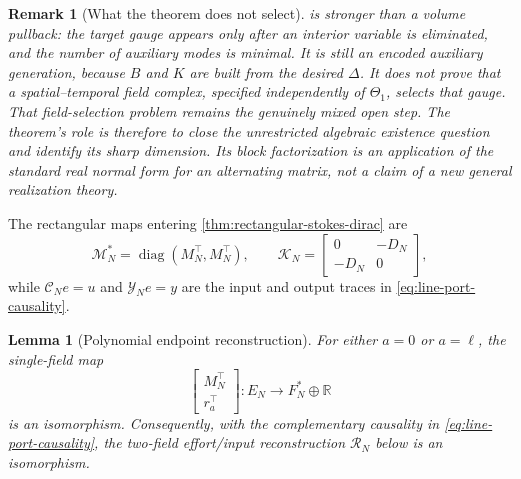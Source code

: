 \documentclass[11pt,a4paper]{article}
\newtheorem{lemma}[theorem]{Lemma}
\newtheorem{remark}[theorem]{Remark}
\newcommand{\diag}{\operatorname{diag}}
\begin{document}
\begin{remark}[What the theorem does not select]
\label{rem:auxiliary-generation-not-selection}
 is stronger than a volume
pullback: the target gauge appears only after an interior variable is
eliminated, and the number of auxiliary modes is minimal.  It is still an
\emph{encoded auxiliary generation}, because \(B\) and \(K\) are built
from the desired \(\Delta\).  It does not prove that a spatial--temporal
field complex, specified independently of \(\Theta_1\), selects that gauge.
That field-selection problem remains the genuinely mixed open step.
The theorem's role is therefore to close the unrestricted algebraic
existence question and identify its sharp dimension.  Its block
factorization is an application of the standard real normal form for an
alternating matrix, not a claim of a new general realization theory.
\end{remark}

The rectangular maps entering \cref{thm:rectangular-stokes-dirac} are
\begin{equation}\label{eq:line-rectangular-maps}
 \mathcal M_N^*=\diag(M_N^\top,M_N^\top),\qquad
 \mathcal K_N=
 \begin{bmatrix}0&-D_N\\-D_N&0\end{bmatrix},
\end{equation}
while \(\mathcal C_Ne=u\) and \(\mathcal Y_Ne=y\) are the input and
output traces in \cref{eq:line-port-causality}.
\begin{lemma}[Polynomial endpoint reconstruction]
\label{lem:polynomial-endpoint-reconstruction}
For either \(a=0\) or \(a=\ell\), the single-field map
\begin{equation}\label{eq:single-field-endpoint-reconstruction}
 \begin{bmatrix}M_N^\top\\ r_a^\top\end{bmatrix}:
 E_N\longrightarrow F_N^*\oplus\mathbb R
\end{equation}
is an isomorphism.  Consequently, with the complementary causality in
\cref{eq:line-port-causality}, the two-field effort/input reconstruction
\(\mathcal R_N\) below is an isomorphism.
\end{lemma}
\end{document}
